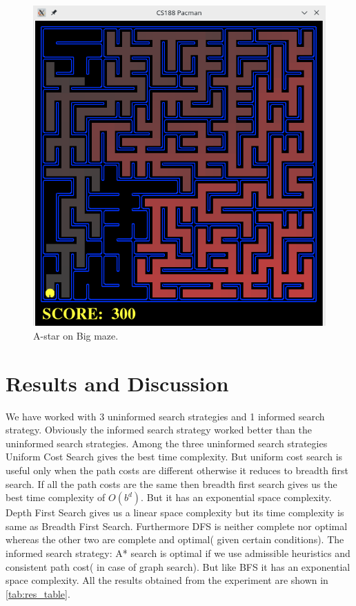 \documentclass[
10pt, %
a4paper, %
oneside, %
headinclude,footinclude, %
BCOR5mm, %
]{scrartcl}
\begin{document}
\begin{figure}[h!]
	\centering
	\includegraphics[width=.7\textwidth]{images/fig_12_bigmaze_astar.png}
	\caption{ A-star on Big maze.}
	\label{fig:fig_12_bigmaze_astar}
\end{figure}





\section{\textbf{Results and Discussion}}


We have worked with 3 uninformed search strategies and 1 informed search 
strategy. Obviously the informed search strategy worked better than the 
uninformed search strategies. Among the three uninformed search strategies 
Uniform Cost Search gives the best time complexity. But uniform cost search is 
useful only when the path costs are different otherwise it reduces to breadth 
first search.
If all the path costs are the same then breadth first search gives us the best 
time complexity of $O(b^d)$. But it has an exponential space complexity. Depth 
First Search gives us a linear space complexity but its time complexity is same 
as Breadth First Search. Furthermore DFS is neither complete nor optimal whereas
the other two are complete and optimal( given certain conditions).
The informed search strategy: A* search is optimal if we use admissible 
heuristics and consistent path cost( in case of graph search). But like BFS it 
has an exponential space complexity.
All the results obtained from the experiment are shown in \autoref{tab:res_table}.
\end{document}
